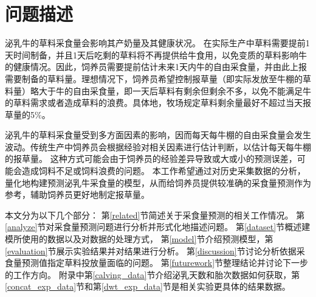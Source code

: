 \section{问题描述}
\label{introduction}


泌乳牛的草料采食量会影响其产奶量及其健康状况。
在实际生产中草料需要提前1天时间制备，并且1天后吃剩的草料将不再提供给牛食用，以免变质的草料影响牛的健康情况。因此，饲养员需要提前估计未来1天内牛的自由采食量，并由此上报需要制备的草料量。理想情况下，饲养员希望控制报草量（即实际发放至牛棚的草料量）略大于牛的自由采食量，即一天后草料有剩余但剩余不多，以免不能满足牛的草料需求或者造成草料的浪费。具体地，牧场规定草料剩余量最好不超过当天报草量的5\%。

泌乳牛的草料采食量受到多方面因素的影响，因而每天每牛棚的自由采食量会发生波动。传统生产中饲养员会根据经验对相关因素进行估计判断，以估计每天每牛棚的报草量。
这种方式可能会由于饲养员的经验差异导致或大或小的预测误差，可能会造成饲料不足或饲料浪费的问题。
本工作希望通过对历史采集数据的分析，量化地构建预测泌乳牛采食量的模型，从而给饲养员提供较准确的采食量预测作为参考，辅助饲养员更好地制定报草量。

本文分为以下几个部分：
第\ref{related}节简述关于采食量预测的相关工作情况。
第\ref{analyze}节对采食量预测问题进行分析并形式化地描述问题。
第\ref{dataset}节概述建模所使用的数据以及对数据的处理方式，
第\ref{model}节介绍预测模型，第\ref{evaluation}节展示实验结果并对结果进行分析。
第\ref{discussion}节讨论分析依据采食量预测值指定草料投放量面临的问题。
第\ref{futurework}节整理结论并讨论下一步的工作方向。
附录中第\ref{calving_data}节介绍泌乳天数和胎次数据如何获取，第\ref{concat_exp_data}节和第\ref{dwt_exp_data}节是相关实验更具体的结果数据。
